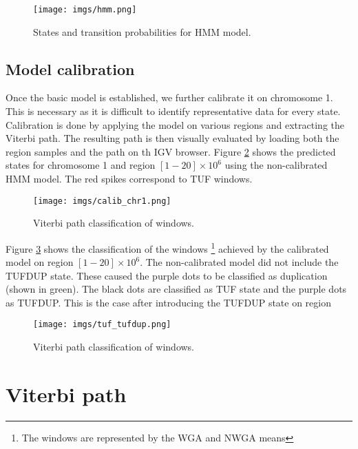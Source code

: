 \begin{figure}[!htb]
	\begin{center}
		\texttt{[image: imgs/hmm.png]}
	\end{center}
	\caption{States and transition probabilities for HMM model.}
	\label{hmm_figure}
\end{figure} 

   

\subsection{Model calibration}
\label{model_calibration}

Once the basic model is  established, we further calibrate it on chromosome 1. 
This is necessary as it is difficult to identify representative data for every state. Calibration is done by applying 
the model on various regions and extracting the Viterbi path. The resulting path is then visually evaluated by loading both the region samples and the path on th IGV browser.  Figure \ref{calib_chr1} shows the predicted states for chromosome 1 and region $[1-20]\times 10^6$ using the non-calibrated HMM model. The red spikes correspond to TUF windows.  

\begin{figure}[!htb]
	\begin{center}
		\texttt{[image: imgs/calib\_chr1.png]}
	\end{center}
	\caption{Viterbi path classification of windows.}
	\label{calib_chr1}
\end{figure}

Figure \ref{tuf_tufdup} shows the classification of the windows \footnote{The windows are represented by the WGA and NWGA means} achieved by the calibrated model on region $[1-20]\times 10^6$. The non-calibrated model did not include the TUFDUP state. These caused the purple dots to be classified as duplication (shown in green). The black dots are classified as TUF state and the purple dots as TUFDUP. This is the case after introducing the TUFDUP state
on region 
	
	
\begin{figure}[!htb]
	\begin{center}
		\texttt{[image: imgs/tuf\_tufdup.png]}
	\end{center}
	\caption{Viterbi path classification of windows.}
	\label{tuf_tufdup}
\end{figure} 

\section{Viterbi path}
\label{viterbi_path}

